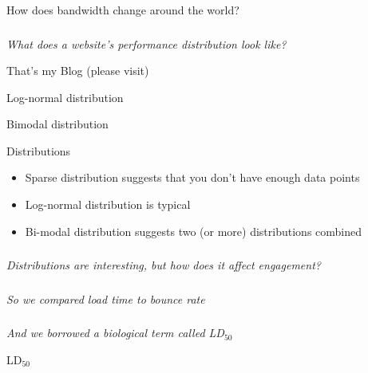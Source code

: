 \documentclass{beamer}
\newcommand{\innersplash}[1]{
  \begin{center}
    \Large \textrm{\textit{ #1 } }
  \end{center}
}
\newcommand{\splashslide}[2][{}]{
  \begin{frame}
  \frametitle{#1}
  \innersplash{#2}
  \end{frame}
}
\newcommand{\textsubscript}[1]{\ensuremath{_{\textrm{#1}}}}
\begin{document}
\begin{frame}{How does bandwidth change around the world?}
\end{frame}


\splashslide{What does a website's performance distribution look like?}

\begin{frame}{That's my Blog (please visit)}
\end{frame}

\begin{frame}{Log-normal distribution}
\end{frame}

\begin{frame}{Bimodal distribution}
\end{frame}

\begin{frame}{Distributions}
\begin{itemize}
  \item Sparse distribution suggests that you don't have enough data points
  \item Log-normal distribution is typical
  \item Bi-modal distribution suggests two (or more) distributions combined
\end{itemize}
\end{frame}

\splashslide{Distributions are interesting, but how does it affect engagement?}

\splashslide{So we compared load time to bounce rate}

\splashslide{And we borrowed a biological term called LD\textsubscript{50}}

\begin{frame}{LD\textsubscript{50}}
\end{frame}
\end{document}
